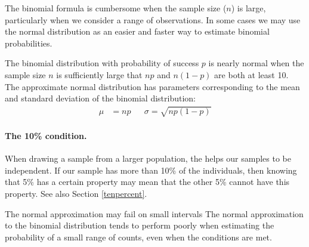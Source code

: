 
The binomial formula is cumbersome when the sample size ($n$) is large, particularly when we consider a range of observations. In some cases we may use the normal distribution as an easier and faster way to estimate binomial probabilities.


\begin{termBox}{
The binomial distribution with probability of success $p$ is nearly normal when the sample size $n$ is sufficiently large that $np$ and $n(1-p)$ are both at least 10. The approximate normal distribution has parameters corresponding to the mean and standard deviation of the binomial distribution:\vspace{-1.5mm}
\begin{align*}
\mu &= np
&&\sigma= \sqrt{np(1-p)}
\end{align*}}
\end{termBox}


\paragraph{The 10\% condition.}
When drawing a sample from a larger population, the  helps our samples to be independent. If our sample has more than 10\% of the individuals, then knowing that 5\% has a certain property may mean that the other 5\% cannot have this property. See also Section \ref{tenpercent}.



\begin{caution}
{The normal approximation may fail on small intervals}
{The normal approximation to the binomial distribution tends to perform poorly when estimating the probability of a small range of counts, even when the conditions are met.}
\end{caution}

